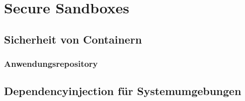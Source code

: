 \chapter{Secure Sandboxes}
\label{sec:secure_sandboxes}

\section{Sicherheit von Containern}
\label{sec:sicherheit_von_containern}

\subsection{Anwendungsrepository}
\label{subsec:anwendungsrepository}

\section{Dependencyinjection für Systemumgebungen}
\label{sec:sicherheit_von_containern}